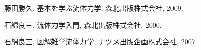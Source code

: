 \documentclass[10pt,b5paper,papersize,dvipdfmx]{jsbook}
\begin{document}
\begin{thebibliography}{99}
  \item 藤田勝久, 基本を学ぶ流体力学, 森北出版株式会社, 2009.
  \item 石綿良三, 流体力学入門, 森北出版株式会社, 2000.
  \item 石綿良三, 図解雑学流体力学, ナツメ出版企画株式会社, 2007.
\end{thebibliography}
\end{document}
